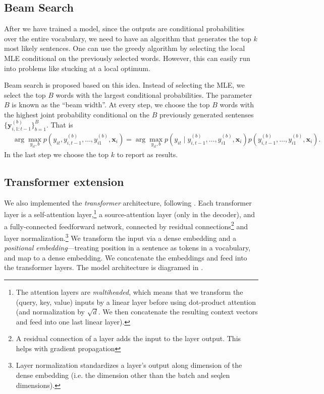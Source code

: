 \documentclass[12pt]{article}
\begin{document}
\subsection{Beam Search}
\label{sub:beam}
After we have trained a model, since the outputs are conditional probabilities over the entire vocabulary, we need to have an algorithm that generates the top $k$ most likely sentences. One can use the greedy algorithm by selecting the local MLE conditional on the previously selected words. However, this can easily run into problems like stucking at a local optimum.

Beam search is proposed based on this idea. Instead of selecting the MLE, we select the top $B$ words with the largest conditional probabilities. The parameter $B$ is known as the ``beam width''. At every step, we choose the top $B$ words with the highest joint probability conditional on the $B$ previously generated sentenses $\{\bm y_{i, 1:t-1}^{(b)}\}_{b=1}^B$. That is
\begin{align}
	&\arg \max_{y_{it}, b} p(y_{it}, y_{i,t-1}^{(b)}, \dots, y_{i1}^{(b)}, \bm x_i)\nonumber = \arg \max_{y_{it}, b} p(y_{it} \mid y_{i,t-1}^{(b)}, \dots, y_{i1}^{(b)}, \bm x_i) p(y_{i,t-1}^{(b)}, \dots, y_{i1}^{(b)}, \bm x_i).
\end{align}
In the last step we choose the top $k$ to report as results.


\subsection{Transformer extension}
We also implemented the \emph{transformer} architecture, following 
\cite{vaswani2017attention}. Each transformer layer is a self-attention
layer,\footnote{The attention layers are \emph{multiheaded}, which means that
we transform the (query, key, value) inputs by a linear layer before using
dot-product attention (and normalization by $\sqrt{d}$. We then concatenate
the resulting context vectors and feed into one last linear layer).} a
source-attention layer (only in the decoder), and a fully-connected feedforward
network, connected by residual connections\footnote{A residual
connection of a layer adds the input to the layer output. This helps with
gradient propagation} and layer normalization.\footnote{Layer normalization
standardizes a layer's output along dimension of the dense embedding (i.e.
the dimension other than the batch and seqlen dimensions).} We
transform
the input via a dense embedding and a \emph{positional embedding}---treating
position in a sentence as tokens in a vocabulary, and map to a dense embedding.
We concatenate the embeddings and feed into the transformer layers. The model
architecture is diagramed in . 
\end{document}
